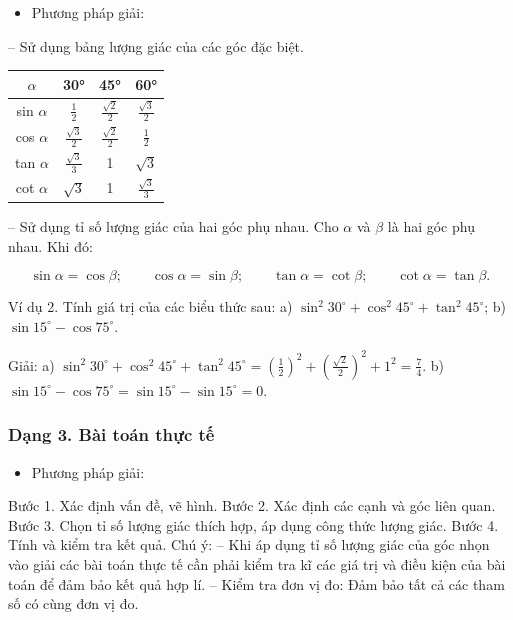 \documentclass[%
    fontsize=12pt,%
    chapterprefix=false,%
    open=right,%
    twoside=false,%
    numbers=noenddot,%
    headings=optiontohead,%
    final,%
    DIV=15,%
    parskip=half %
]{scrbook}
\begin{document}
\begin{itemize}
  \item Phương pháp giải:
\end{itemize}

-- Sử dụng bảng lượng giác của các góc đặc biệt.

\begin{tabular}{|c|c|c|c|} \hline $\alpha$ & 30° & 45° & 60° \\ \hline sin $\alpha$ & $ \frac{1}{2} $ & $ \frac{\sqrt{2}}{2} $ & $ \frac{\sqrt{3}}{2} $ \\ \hline cos $\alpha$ & $ \frac{\sqrt{3}}{2} $ & $ \frac{\sqrt{2}}{2} $ & $ \frac{1}{2} $ \\ \hline tan $\alpha$ & $ \frac{\sqrt{3}}{3} $ & 1 & $ \sqrt{3} $ \\ \hline cot $\alpha$ & $ \sqrt{3} $ & 1 & $ \frac{\sqrt{3}}{3} $ \\ \hline \end{tabular}

-- Sử dụng tỉ số lượng giác của hai góc phụ nhau. Cho $\alpha$ và $\beta$ là hai góc phụ nhau. Khi đó:

\[
\sin \alpha = \cos \beta; \qquad \cos \alpha = \sin \beta; \qquad \tan \alpha = \cot \beta; \qquad \cot \alpha = \tan \beta.
\]

Ví dụ 2. Tính giá trị của các biểu thức sau: a) $ \sin^2 30^\circ + \cos^2 45^\circ + \tan^2 45^\circ $; b) $ \sin 15^\circ - \cos 75^\circ $.

Giải: a) $ \sin^2 30^\circ + \cos^2 45^\circ + \tan^2 45^\circ = \left( \frac{1}{2} \right)^2 + \left( \frac{\sqrt{2}}{2} \right)^2 + 1^2 = \frac{7}{4} $. b) $ \sin 15^\circ - \cos 75^\circ = \sin 15^\circ - \sin 15^\circ = 0 $.
\subsubsection{Dạng 3. Bài toán thực tế}

\begin{itemize}
  \item Phương pháp giải:
\end{itemize}

Bước 1. Xác định vấn đề, vẽ hình. Bước 2. Xác định các cạnh và góc liên quan. Bước 3. Chọn tỉ số lượng giác thích hợp, áp dụng công thức lượng giác. Bước 4. Tính và kiểm tra kết quả. Chú ý: -- Khi áp dụng tỉ số lượng giác của góc nhọn vào giải các bài toán thực tế cần phải kiểm tra kĩ các giá trị và điều kiện của bài toán để đảm bảo kết quả hợp lí. -- Kiểm tra đơn vị đo: Đảm bảo tất cả các tham số có cùng đơn vị đo.
\end{document}
